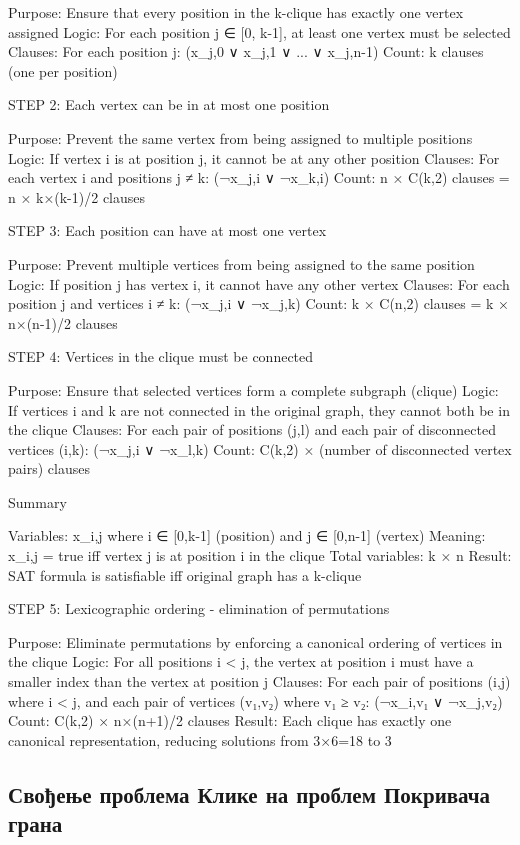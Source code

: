 \documentclass[12pt,oneside]{memoir}
\begin{document}
Purpose: Ensure that every position in the k-clique has exactly one vertex assigned
Logic: For each position j ∈ [0, k-1], at least one vertex must be selected
Clauses: For each position j: (x_{j,0} ∨ x_{j,1} ∨ ... ∨ x_{j,n-1})
Count: k clauses (one per position)

STEP 2: Each vertex can be in at most one position

Purpose: Prevent the same vertex from being assigned to multiple positions
Logic: If vertex i is at position j, it cannot be at any other position
Clauses: For each vertex i and positions j ≠ k: (¬x_{j,i} ∨ ¬x_{k,i})
Count: n × C(k,2) clauses = n × k×(k-1)/2 clauses

STEP 3: Each position can have at most one vertex

Purpose: Prevent multiple vertices from being assigned to the same position
Logic: If position j has vertex i, it cannot have any other vertex
Clauses: For each position j and vertices i ≠ k: (¬x_{j,i} ∨ ¬x_{j,k})
Count: k × C(n,2) clauses = k × n×(n-1)/2 clauses

STEP 4: Vertices in the clique must be connected

Purpose: Ensure that selected vertices form a complete subgraph (clique)
Logic: If vertices i and k are not connected in the original graph, they cannot both be in the clique
Clauses: For each pair of positions (j,l) and each pair of disconnected vertices (i,k): (¬x_{j,i} ∨ ¬x_{l,k})
Count: C(k,2) × (number of disconnected vertex pairs) clauses

Summary

Variables: x_{i,j} where i ∈ [0,k-1] (position) and j ∈ [0,n-1] (vertex)
Meaning: x_{i,j} = true iff vertex j is at position i in the clique
Total variables: k × n
Result: SAT formula is satisfiable iff original graph has a k-clique

STEP 5: Lexicographic ordering - elimination of permutations

Purpose: Eliminate permutations by enforcing a canonical ordering of vertices in the clique
Logic: For all positions i < j, the vertex at position i must have a smaller index than the vertex at position j
Clauses: For each pair of positions (i,j) where i < j, and each pair of vertices (v₁,v₂) where v₁ ≥ v₂: (¬x_{i,v₁} ∨ ¬x_{j,v₂})
Count: C(k,2) × n×(n+1)/2 clauses
Result: Each clique has exactly one canonical representation, reducing solutions from 3×6=18 to 3


\subsection{Свођење проблема Клике на проблем Покривача грана}
\end{document}
